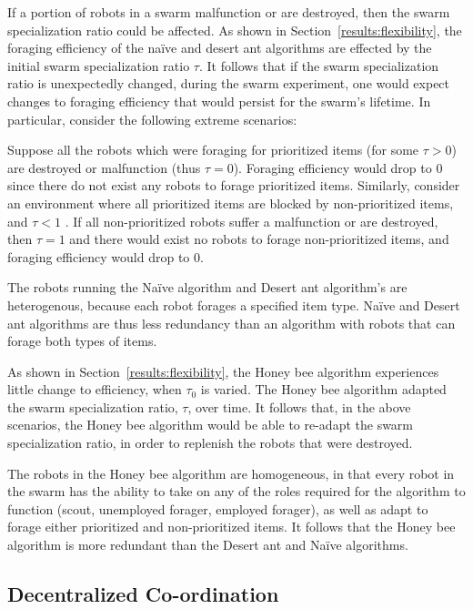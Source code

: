 If a portion of robots in a swarm malfunction or are destroyed, then the swarm specialization ratio could be affected. As shown in Section~\ref{results:flexibility}, the foraging efficiency of the na\"ive and desert ant algorithms are effected by the initial swarm specialization ratio $\tau$. It follows that if the swarm specialization ratio is unexpectedly changed, during the swarm experiment, one would expect changes to foraging efficiency that would persist for the swarm's lifetime. In particular, consider the following extreme scenarios: 

Suppose all the robots which were foraging for prioritized items (for some $\tau > 0$) are destroyed or malfunction (thus $\tau=0$). Foraging efficiency would drop to 0 since there do not exist any robots to forage prioritized items. Similarly, consider an environment where all prioritized items are blocked by non-prioritized items, and $\tau < 1$ . If all non-prioritized robots suffer a malfunction or are destroyed, then $\tau=1$ and there would exist no robots to forage non-prioritized items, and foraging efficiency would drop to 0. 

The robots running the Na\"ive algorithm and Desert ant algorithm's are heterogenous, because each robot forages a specified item type. Na\"ive and Desert ant algorithms are thus less redundancy than an algorithm with robots that can forage both types of items.

As shown in Section~\ref{results:flexibility}, the Honey bee algorithm experiences little change to efficiency, when $\tau_0$ is varied. The Honey bee algorithm adapted the swarm specialization ratio, $\tau$, over time. It follows that, in the above scenarios, the Honey bee algorithm would be able to re-adapt the swarm specialization ratio, in order to replenish the robots that were destroyed. 

The robots in the Honey bee algorithm are homogeneous, in that every robot in the swarm has the ability to take on any of the roles required for the algorithm to function (scout, unemployed forager, employed forager), as well as adapt to forage either prioritized and non-prioritized items. It follows that the Honey bee algorithm is more redundant than the Desert ant and Na\"ive algorithms.

\subsection{Decentralized Co-ordination}
\label{results:decentralizedcoordination}

